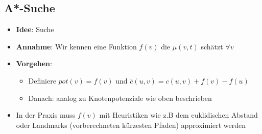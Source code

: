 \subsection{A*-Suche}%
\label{sp:sub:a_suche}

\begin{itemize}
	\item \textbf{Idee}: Suche 
	\item \textbf{Annahme}: Wir kennen eine Funktion $f(v)$ die $\mu(v,t)$ schätzt $\forall v$
	\item \textbf{Vorgehen}:
	\begin{itemize}
		\item Definiere $pot(v) = f(v)$ und $\overline{c}(u,v) = c(u,v) + f(v) - f(u)$
		\item Danach: analog zu Knotenpotenziale wie oben beschrieben
	\end{itemize}
	\item In der Praxis muss $f(v)$ mit Heuristiken wie z.B dem euklidischen Abstand oder Landmarks (vorberechneten kürzesten Pfaden) approximiert werden
\end{itemize}